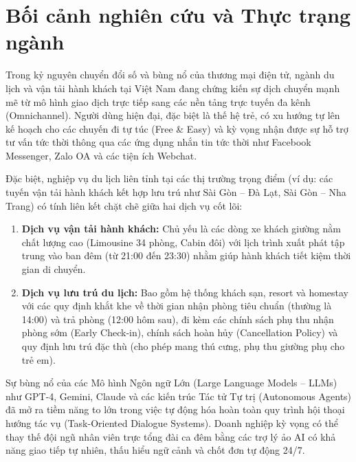 \section{Bối cảnh nghiên cứu và Thực trạng ngành}

Trong kỷ nguyên chuyển đổi số và bùng nổ của thương mại điện tử, ngành du lịch và vận tải hành khách tại Việt Nam đang chứng kiến sự dịch chuyển mạnh mẽ từ mô hình giao dịch trực tiếp sang các nền tảng trực tuyến đa kênh (Omnichannel). Người dùng hiện đại, đặc biệt là thế hệ trẻ, có xu hướng tự lên kế hoạch cho các chuyến đi tự túc (Free \& Easy) và kỳ vọng nhận được sự hỗ trợ tư vấn tức thời thông qua các ứng dụng nhắn tin tức thời như Facebook Messenger, Zalo OA và các tiện ích Webchat.

Đặc biệt, nghiệp vụ du lịch liên tỉnh tại các thị trường trọng điểm (ví dụ: các tuyến vận tải hành khách kết hợp lưu trú như Sài Gòn -- Đà Lạt, Sài Gòn -- Nha Trang) có tính liên kết chặt chẽ giữa hai dịch vụ cốt lõi:
\begin{enumerate}
    \item \textbf{Dịch vụ vận tải hành khách:} Chủ yếu là các dòng xe khách giường nằm chất lượng cao (Limousine 34 phòng, Cabin đôi) với lịch trình xuất phát tập trung vào ban đêm (từ 21:00 đến 23:30) nhằm giúp hành khách tiết kiệm thời gian di chuyển.
    \item \textbf{Dịch vụ lưu trú du lịch:} Bao gồm hệ thống khách sạn, resort và homestay với các quy định khắt khe về thời gian nhận phòng tiêu chuẩn (thường là 14:00) và trả phòng (12:00 hôm sau), đi kèm các chính sách phụ thu nhận phòng sớm (Early Check-in), chính sách hoàn hủy (Cancellation Policy) và quy định lưu trú đặc thù (cho phép mang thú cưng, phụ thu giường phụ cho trẻ em).
\end{enumerate}

Sự bùng nổ của các Mô hình Ngôn ngữ Lớn (Large Language Models -- LLMs) như GPT-4, Gemini, Claude và các kiến trúc Tác tử Tự trị (Autonomous Agents) đã mở ra tiềm năng to lớn trong việc tự động hóa hoàn toàn quy trình hội thoại hướng tác vụ (Task-Oriented Dialogue Systems). Doanh nghiệp kỳ vọng có thể thay thế đội ngũ nhân viên trực tổng đài ca đêm bằng các trợ lý ảo AI có khả năng giao tiếp tự nhiên, thấu hiểu ngữ cảnh và chốt đơn tự động 24/7.
